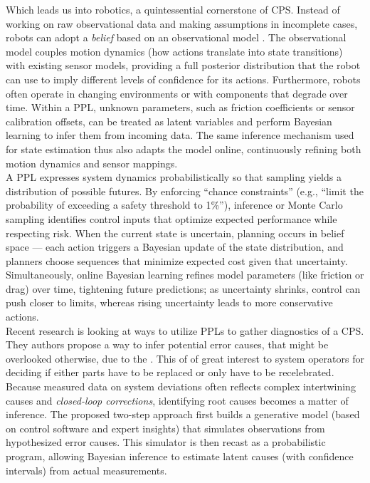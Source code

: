 \documentclass[11pt]{report}
\begin{document}
Which leads us into robotics, a quintessential cornerstone of CPS. Instead of working on raw observational data and making assumptions in incomplete cases, robots can adopt 
a \textit{belief} based on an observational model \cite{cpsProbabilisticRobotics}. The observational model couples motion dynamics (how actions translate into state 
transitions) with existing sensor models, providing a full posterior distribution that the robot can use to imply different levels of confidence for its actions.
Furthermore, robots often operate in changing environments or with components that degrade over time. Within a PPL, unknown parameters, such as friction 
coefficients or sensor calibration offsets, can be treated as latent variables and perform Bayesian learning to infer them from incoming data. The same inference mechanism used for state 
estimation thus also adapts the model online, continuously refining both motion dynamics and sensor mappings.\\

A PPL expresses system dynamics probabilistically so that sampling yields a distribution of possible futures. \cite{cpsPredictiveControl} By enforcing “chance constraints” 
(e.g., “limit the probability of exceeding a safety threshold to 1\%”), inference or Monte Carlo sampling identifies control inputs that optimize expected performance while 
respecting risk. When the current state is uncertain, planning occurs in belief space — each action triggers a Bayesian update of the state distribution, and planners 
choose sequences that minimize expected cost given that uncertainty. Simultaneously, online Bayesian learning refines model parameters (like friction or drag) over time, 
tightening future predictions; as uncertainty shrinks, control can push closer to limits, whereas rising uncertainty leads to more conservative actions.\\

Recent research is looking at ways to utilize PPLs to gather diagnostics of a CPS. \cite{cpsPPLDiagnostics} They authors propose a way to infer potential error causes, that
might be overlooked otherwise, due to the . 
This of of great interest to system operators for deciding if either parts have to be replaced or only have to be recelebrated. Because measured data on system deviations
often reflects complex intertwining causes and \textit{closed-loop corrections}, identifying root causes becomes a matter of inference. The proposed two-step approach 
first builds a generative model (based on control software and expert insights) that simulates observations from hypothesized error causes. This simulator is then recast 
as a probabilistic program, allowing Bayesian inference to estimate latent causes (with confidence intervals) from actual measurements.
\end{document}
